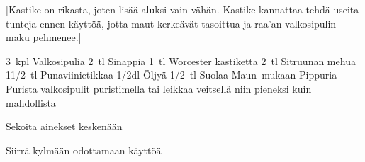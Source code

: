 [Kastike on rikasta, joten lisää aluksi vain vähän. Kastike kannattaa tehdä useita tunteja ennen käyttöä, jotta maut kerkeävät tasoittua ja raa'an valkosipulin maku pehmenee.]

\begin{step}
    3~kpl Valkosipulia
    2~tl Sinappia
    1~tl Worcester kastiketta
    2~tl Sitruunan mehua
    11/2~tl Punaviinietikkaa
    1/2dl Öljyä
    1/2~tl Suolaa
    Maun~mukaan Pippuria
    \method
    Purista valkosipulit puristimella tai leikkaa veitsellä niin pieneksi kuin mahdollista

    Sekoita ainekset keskenään

    Siirrä kylmään odottamaan käyttöä
\end{step}
